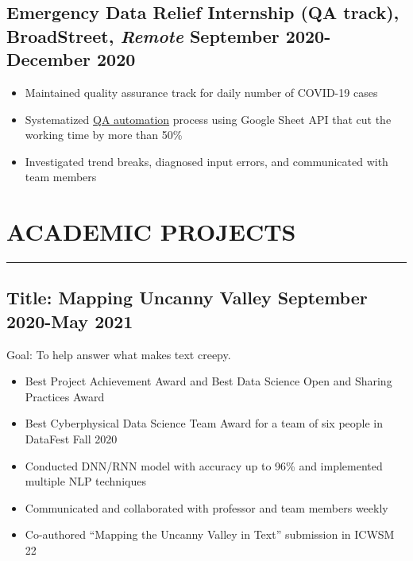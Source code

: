 \documentclass[12pt]{article}
\newcommand{\divider}{\vskip2pt{\color{black}\hrule}\vskip2pt}
\begin{document}
\subsection*{Emergency Data Relief Internship (QA track){\normalfont, BroadStreet, \textit{Remote} \hfill September 2020-December 2020}}
\begin{itemize}
    \setlength\itemsep{-1pt}
    \item Maintained quality assurance track for daily number of COVID-19 cases
    \item Systematized \href{https://github.com/Anthonyive/broadstreet-qa-automation.git}{QA automation} 
        process using Google Sheet API that cut the working time by more than 
        50\%
    \item Investigated trend breaks, diagnosed input errors, and communicated 
        with team members
\end{itemize}

\section*{ACADEMIC PROJECTS}
\divider

\subsection*{Title: Mapping Uncanny Valley \hfill {\normalfont September 2020-May 2021}}
\noindent
\href{https://github.com/Anthonyive/Research-Mapping-Uncanny-Valley.git}{} Goal: To help answer what makes text creepy.
\begin{itemize}
    \setlength\itemsep{-1pt}
    \item Best Project Achievement Award and Best Data Science Open and 
        Sharing Practices Award
    \item Best Cyberphysical Data Science Team Award for a team of six people 
        in DataFest Fall 2020
    \item Conducted DNN/RNN model with accuracy up to 96\% and implemented 
        multiple NLP techniques
    \item Communicated and collaborated with professor and team members weekly
    \item Co-authored ``Mapping the Uncanny Valley in Text'' submission in 
        ICWSM 22
\end{itemize}
\end{document}

